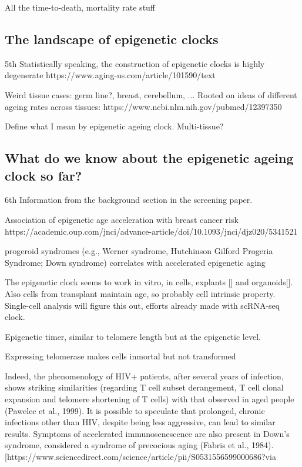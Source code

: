 All the time-to-death, mortality rate stuff


\subsection{The landscape of epigenetic clocks}

5th
Statistically speaking, the construction of epigenetic clocks is highly degenerate
https://www.aging-us.com/article/101590/text

Weird tissue cases: germ line?, breast, cerebellum, ...
Rooted on ideas of different ageing rates across tissues:
https://www.ncbi.nlm.nih.gov/pubmed/12397350

Define what I mean by epigenetic ageing clock. Multi-tissue? 


\subsection{What do we know about the epigenetic ageing clock so far?}

6th
Information from the background section in the screening paper.

Association of epigenetic age acceleration with breast cancer risk https://academic.oup.com/jnci/advance-article/doi/10.1093/jnci/djz020/5341521

progeroid syndromes (e.g., Werner syndrome, Hutchinson Gilford Progeria Syndrome; Down syndrome) correlates with accelerated epigenetic aging

The epigenetic clock seems to work in vitro, in cells, explants [] and organoids[]. Also cells from transplant maintain age, so probably cell intrinsic property. Single-cell analysis will figure this out, efforts already made with scRNA-seq clock.

Epigenetic timer, similar to telomere length but at the epigenetic level.

Expressing telomerase makes cells inmortal but not transformed 


Indeed, the phenomenology of HIV+ patients, after several years of infection, shows striking similarities (regarding T cell subset derangement, T cell clonal expansion and telomere shortening of T cells) with that observed in aged people (Pawelec et al., 1999). It is possible to speculate that prolonged, chronic infections other than HIV, despite being less aggressive, can lead to similar results. Symptoms of accelerated immunosenescence are also present in Down’s syndrome, considered a syndrome of precocious aging (Fabris et al., 1984). [https://www.sciencedirect.com/science/article/pii/S0531556599000686?via%

